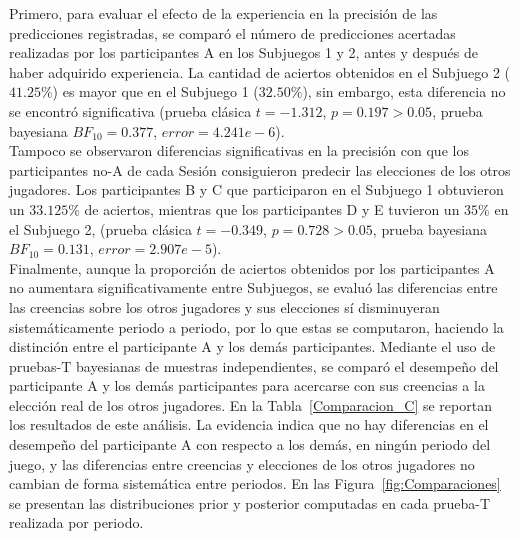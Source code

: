 Primero, para evaluar el efecto de la experiencia en la precisión de las predicciones registradas, se comparó el número de predicciones acertadas realizadas por los participantes A en los Subjuegos 1 y 2, antes y después de haber adquirido experiencia. La cantidad de aciertos obtenidos en el Subjuego 2 ($41.25\%$) es mayor que en el Subjuego 1 ($32.50\%$), sin embargo, esta diferencia no se encontró significativa (prueba clásica $t = -1.312$, $p = 0.197 > 0.05$, prueba bayesiana $BF_{10} = 0.377$, $error = 4.241e - 6$).\\

Tampoco se observaron diferencias significativas en la precisión con que los participantes no-A de cada Sesión consiguieron predecir las elecciones de los otros jugadores. Los participantes B y C que participaron en el Subjuego 1 obtuvieron un $33.125\%$ de aciertos, mientras que los participantes D y E tuvieron un $35\%$ en el Subjuego 2,  (prueba clásica $t = -0.349$, $p = 0.728 > 0.05$, prueba bayesiana $BF_{10} = 0.131$, $error = 2.907e - 5$).\\

Finalmente, aunque la proporción de aciertos obtenidos por los participantes A no aumentara significativamente entre Subjuegos, se evaluó las diferencias entre las creencias sobre los otros jugadores y sus elecciones sí disminuyeran sistemáticamente periodo a periodo, por lo que estas se computaron, haciendo la distinción entre  el participante A y los demás participantes. Mediante el uso de pruebas-T bayesianas de muestras independientes,  se comparó el desempeño del participante A y los demás participantes para acercarse con sus creencias a la elección real de los otros jugadores. En la Tabla~\ref{Comparacion_C} se reportan los resultados de este análisis. La evidencia indica que no hay diferencias en el desempeño del participante A con respecto a los demás, en ningún periodo del juego, y las diferencias entre creencias y elecciones de los otros jugadores no cambian de forma sistemática entre periodos. En las Figura~\ref{fig:Comparaciones} se presentan las distribuciones prior y posterior computadas en cada prueba-T realizada por periodo.\\

